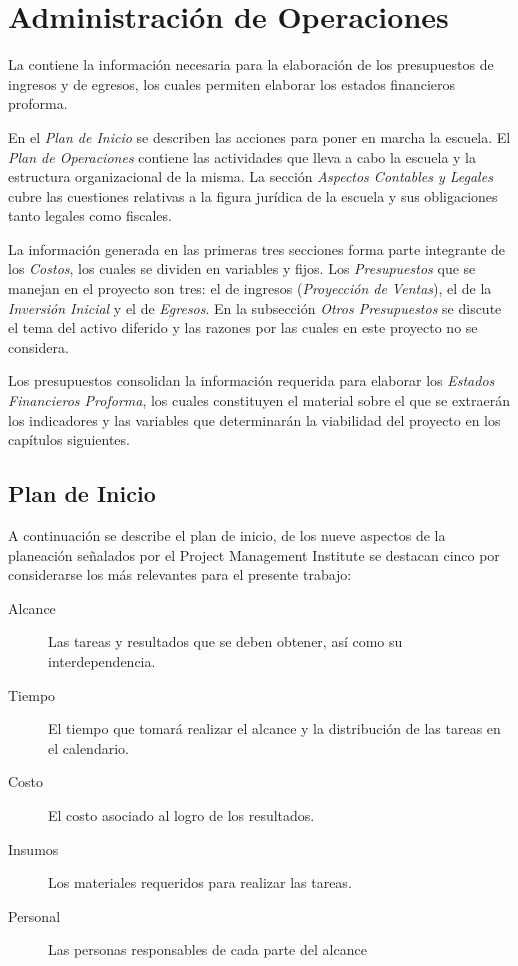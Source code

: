 \chapter{Administración de Operaciones}
\label{ch:AdministracionOperaciones}

La \emph{} contiene la información necesaria para la elaboración de los presupuestos de ingresos y de egresos, los cuales permiten elaborar los estados financieros proforma.

En el \emph{Plan de Inicio} se describen las acciones para poner en marcha la escuela. El \emph{Plan de Operaciones} contiene las actividades que lleva a cabo la escuela y la estructura organizacional de la misma. La sección \emph{Aspectos Contables y Legales} cubre las cuestiones relativas a la figura jurídica de la escuela y sus obligaciones tanto legales como fiscales.

La información generada en las primeras tres secciones forma parte integrante de los \emph{Costos}, los cuales se dividen en variables y fijos. Los \emph{Presupuestos} que se manejan en el proyecto son tres: el de ingresos (\emph{Proyección de Ventas}), el de la \emph{Inversión Inicial} y el de \emph{Egresos}. En la subsección \emph{Otros Presupuestos} se discute el tema del activo diferido y las razones por las cuales en este proyecto no se considera.

Los presupuestos consolidan la información requerida para elaborar los \emph{Estados Financieros Proforma}, los cuales constituyen el material sobre el que se extraerán los indicadores y las variables que determinarán la viabilidad del proyecto en los capítulos siguientes.

\section{Plan de Inicio}
\label{sec:Plan:Inicio}

A continuación se describe el plan de inicio, de los nueve aspectos de la planeación señalados por el Project Management Institute \citep{PMBOK2008} se destacan cinco por considerarse los más relevantes para el presente trabajo:

\begin{description}
	\item [Alcance]  Las tareas y resultados que se deben obtener, así como su interdependencia.
	\item [Tiempo]   El tiempo que tomará realizar el alcance y la distribución de las tareas en el calendario.
	\item [Costo]    El costo asociado al logro de los resultados.
	\item [Insumos]  Los materiales requeridos para realizar las tareas.
	\item [Personal] Las personas responsables de cada parte del alcance
\end{description}

